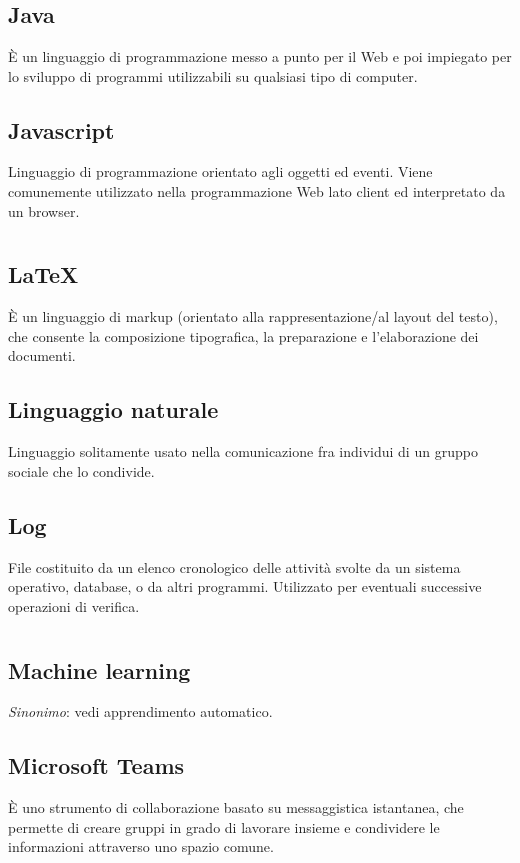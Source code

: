 \section{}
	\subsection*{Java}
	È un linguaggio di programmazione messo a punto per il Web e poi impiegato per lo sviluppo di programmi utilizzabili su qualsiasi tipo di computer.
	\subsection*{Javascript}
	Linguaggio di programmazione orientato agli oggetti ed eventi. Viene comunemente utilizzato nella programmazione Web lato client ed interpretato da un browser.
\pagebreak
\section{}
	\subsection*{\LaTeX{}}
	È un linguaggio di markup (orientato alla rappresentazione/al layout del testo), che consente la composizione tipografica, la preparazione e l'elaborazione dei documenti.
	\subsection*{Linguaggio naturale}
	Linguaggio solitamente usato nella comunicazione fra individui di un gruppo sociale che lo condivide.
	\subsection*{Log}
	File costituito da un elenco cronologico delle attività svolte da un sistema operativo, database, o da altri programmi. Utilizzato per eventuali successive operazioni di verifica.
\pagebreak
\section{}
	\subsection*{Machine learning}
	\emph{Sinonimo}: vedi apprendimento automatico.
	\subsection*{Microsoft Teams}
	È uno strumento di collaborazione basato su messaggistica istantanea, che permette di creare gruppi in grado di lavorare insieme e condividere le informazioni attraverso uno spazio comune.
